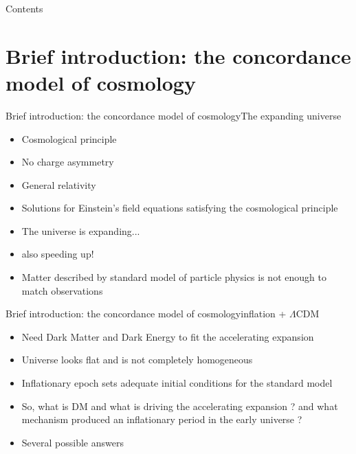 \documentclass{beamer}
\begin{document}
\begin{frame}
  \titlepage
\end{frame}

\begin{frame}{Contents}
  \tableofcontents
\end{frame}

\section{Brief introduction: the concordance model of cosmology}

\begin{frame}{Brief introduction: the concordance model of cosmology}{The expanding universe}
\begin{itemize}
\item Cosmological principle
\item No charge asymmetry
\item General relativity
\item Solutions for Einstein's field equations satisfying the cosmological principle
\item The universe is expanding...
\item also speeding up!
\item Matter described by standard model of particle physics is not enough to match observations
\end{itemize}
\end{frame}

\begin{frame}{Brief introduction: the concordance model of cosmology}{inflation + $\Lambda$CDM}
\begin{itemize}
\item Need Dark Matter and Dark Energy to fit the accelerating expansion
\item Universe looks flat and is not completely homogeneous
\item Inflationary epoch sets adequate initial conditions for the standard model
\item So, what is DM and what is driving the accelerating expansion ? and what mechanism produced an inflationary period in the early universe ?
\item Several possible answers 
\end{itemize}
\end{frame}
\end{document}
